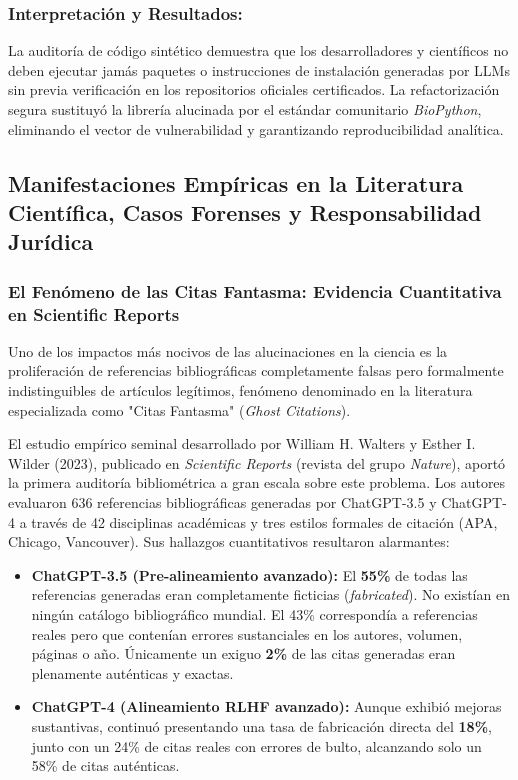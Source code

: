\subsubsection*{Interpretación y Resultados:}
La auditoría de código sintético demuestra que los desarrolladores y científicos no deben ejecutar jamás paquetes o instrucciones de instalación generadas por LLMs sin previa verificación en los repositorios oficiales certificados. La refactorización segura sustituyó la librería alucinada por el estándar comunitario \textit{BioPython}, eliminando el vector de vulnerabilidad y garantizando reproducibilidad analítica.


\subsection{Manifestaciones Empíricas en la Literatura Científica, Casos Forenses y Responsabilidad Jurídica}

\subsubsection{El Fenómeno de las Citas Fantasma: Evidencia Cuantitativa en Scientific Reports}

Uno de los impactos más nocivos de las alucinaciones en la ciencia es la proliferación de referencias bibliográficas completamente falsas pero formalmente indistinguibles de artículos legítimos, fenómeno denominado en la literatura especializada como "Citas Fantasma" (\textit{Ghost Citations}).

El estudio empírico seminal desarrollado por William H. Walters y Esther I. Wilder (2023), publicado en \textit{Scientific Reports} (revista del grupo \textit{Nature}), aportó la primera auditoría bibliométrica a gran escala sobre este problema. Los autores evaluaron 636 referencias bibliográficas generadas por ChatGPT-3.5 y ChatGPT-4 a través de 42 disciplinas académicas y tres estilos formales de citación (APA, Chicago, Vancouver). Sus hallazgos cuantitativos resultaron alarmantes:

\begin{itemize}
    \item \textbf{ChatGPT-3.5 (Pre-alineamiento avanzado):} El \textbf{55\%} de todas las referencias generadas eran completamente ficticias (\textit{fabricated}). No existían en ningún catálogo bibliográfico mundial. El 43\% correspondía a referencias reales pero que contenían errores sustanciales en los autores, volumen, páginas o año. Únicamente un exiguo \textbf{2\%} de las citas generadas eran plenamente auténticas y exactas.
    \item \textbf{ChatGPT-4 (Alineamiento RLHF avanzado):} Aunque exhibió mejoras sustantivas, continuó presentando una tasa de fabricación directa del \textbf{18\%}, junto con un 24\% de citas reales con errores de bulto, alcanzando solo un 58\% de citas auténticas.
\end{itemize}


